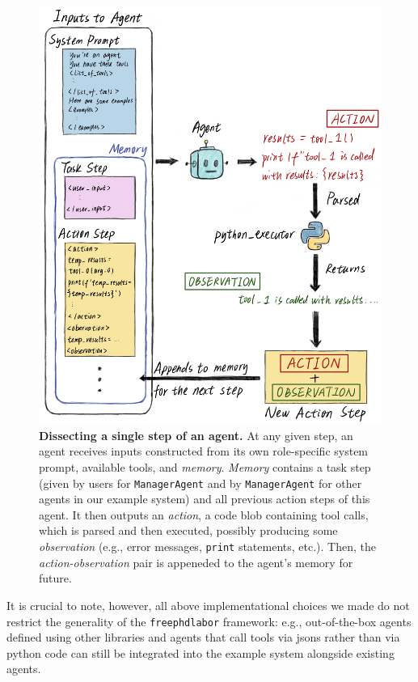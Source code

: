 \documentclass{article}
\begin{document}
\begin{figure}[ht]
\begin{center}
\centerline{\includegraphics[width=\columnwidth]{figures/memory}}
\caption{\textbf{Dissecting a single step of an agent.} At any given step, an agent receives inputs constructed from its own role-specific system prompt, available tools, and \textit{memory}. \textit{Memory} contains a task step (given by users for \texttt{ManagerAgent} and by \texttt{ManagerAgent} for other agents in our example system) and all previous action steps of this agent. It then outputs an \textit{action}, a code blob containing tool calls, which is parsed and then executed, possibly producing some \textit{observation} (e.g., error messages, \texttt{print} statements, etc.). Then, the \textit{action-observation} pair is appeneded to the agent's memory for future.}
\label{fig:memory}
\end{center}
\vskip -0.4in
\end{figure}




It is crucial to note, however, all above implementational choices we made do not restrict the generality of the \texttt{freephdlabor} framework: e.g., out-of-the-box agents defined using other libraries and agents that call tools via jsons rather than via python code can still be integrated into the example system alongside existing agents.
\end{document}
